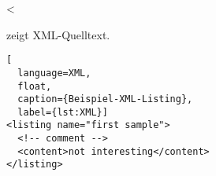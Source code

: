 <%

 zeigt XML-Quelltext.

\begin{LTXexample}
\begin{lstlisting}[
  language=XML,
  float,
  caption={Beispiel-XML-Listing},
  label={lst:XML}]
<listing name="first sample">
  <!-- comment -->
  <content>not interesting</content>
</listing>
\end{lstlisting}
\end{LTXexample}
